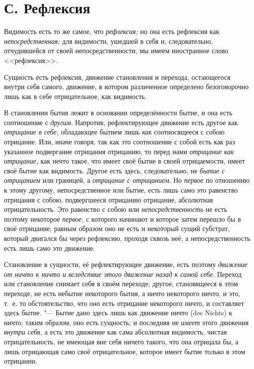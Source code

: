 \section[С. Рефлексия]{С. Рефлексия}
Видимость есть то же самое, что
{\em рефлексия;} но она есть рефлексия как
{\em непосредственная;} для видимости, ушедшей в себя
и, следовательно, отчудившейся от своей непосредственности, мы имеем
иностранное слово <<рефлексия>>.

Сущность есть рефлексия, движение становления и перехода, остающегося внутри
себя самого, движение, в котором различенное определено безоговорочно лишь
как в себе отрицательное, как видимость.

В становлении бытия лежит в основании определённости бытие, и она есть
соотношение с {\em другим}. Напротив, рефлектирующее
движение есть другое как {\em отрицание в себе,}
обладающее бытием лишь {\em как} соотносящееся с собою
отрицание. Или, иначе говоря, так как это соотношение с собой есть как раз
указанное подвергание отрицания отрицанию, то перед нами
{\em отрицание как отрицание,} как нечто такое, что
имеет своё бытие в своей отрицаемости, имеет своё бытие как видимость.
Другое есть здесь, следовательно, не {\em бытие с
отрицанием} или границей, а {\em отрицание с
отрицанием}. Но {\em первое} по отношению к этому
другому, непосредственное или бытие, есть лишь само это равенство отрицания
с собою, подвергшееся отрицанию отрицание, абсолютная отрицательность. Это
равенство с собою или {\em непосредственность} не есть
поэтому некоторое {\em первое,} с которого начинают и
которое затем перешло бы в своё отрицание; равным образом оно не есть и
некоторый сущий субстрат, который двигался бы через рефлексию, проходя
сквозь неё, а непосредственность есть лишь само это движение.

Становление в сущности, её рефлектирующее движение, есть поэтому
{\em движение от ничто к ничто и вследствие этого
движение назад к самой себе}. Переход или становление снимает себя в своём
переходе; другое, становящееся в этом переходе, не есть небытие некоторого
бытия, а ничто некоторого ничто, и это, т.~е. то обстоятельство, что оно
есть отрицание некоторого ничто, и составляет здесь бытие. "--- Бытие дано
здесь лишь как движение ничто (des Nichts) к ничто; таким образом, оно есть
сущность; и последняя не {\em имеет} этого движения
{\em внутри себя,} а есть это движение как сама
абсолютная видимость, чистая отрицательность, не имеющая вне себя ничего
такого, что она отрицала бы, а лишь отрицающая само своё отрицательное,
которое имеет бытие только в этом отрицании.

